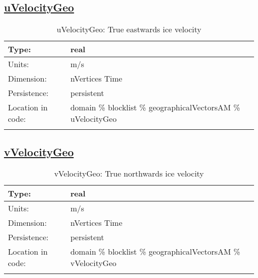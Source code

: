 \subsection[uVelocityGeo]{\hyperref[sec:var_tab_geographicalVectorsAM]{uVelocityGeo}}
\label{subsec:var_sec_geographicalVectorsAM_uVelocityGeo}
\begin{center}
\begin{longtable}{| p{2.0in} | p{4.0in} |}
        \hline 
        Type: & real \\
        \hline 
        Units: & \si{m/s} \\
        \hline 
        Dimension: & nVertices Time \\
        \hline 
        Persistence: & persistent \\
        \hline 
         Location in code: & domain \% blocklist \% geographicalVectorsAM \% uVelocityGeo \\
         \hline 
    \caption{uVelocityGeo: True eastwards ice velocity}
\end{longtable}
\end{center}
\subsection[vVelocityGeo]{\hyperref[sec:var_tab_geographicalVectorsAM]{vVelocityGeo}}
\label{subsec:var_sec_geographicalVectorsAM_vVelocityGeo}
\begin{center}
\begin{longtable}{| p{2.0in} | p{4.0in} |}
        \hline 
        Type: & real \\
        \hline 
        Units: & \si{m/s} \\
        \hline 
        Dimension: & nVertices Time \\
        \hline 
        Persistence: & persistent \\
        \hline 
         Location in code: & domain \% blocklist \% geographicalVectorsAM \% vVelocityGeo \\
         \hline 
    \caption{vVelocityGeo: True northwards ice velocity}
\end{longtable}
\end{center}
